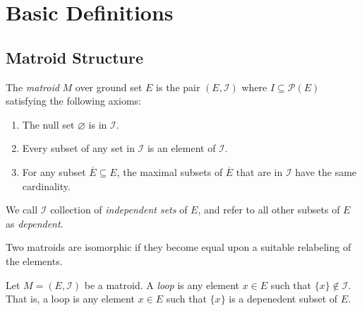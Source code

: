 \section{Basic Definitions}

\subsection{Matroid Structure}

\begin{definition}[matroid]
  \label{def:matroid}
  The \emph{matroid} $M$ over ground set $E$ is the pair $(E,\mathcal{I})$ where $I \subseteq \mathcal{P}(E)$ satisfying the following axioms:
  \begin{enumerate}[label=(\roman*)]
    \item The null set $\varnothing$ is in $\mathcal{I}$.
    \item Every subset of any set in $\mathcal{I}$ is an element of $\mathcal{I}$.
    \item For any subset $\overline{E} \subseteq E$, the maximal subsets of $\overline{E}$ that are in $\mathcal{I}$ have the same cardinality.
  \end{enumerate}
  We call $\mathcal{I}$ collection of \emph{independent sets} of $E$, and refer to all other subsets of $E$ as \emph{dependent}.
\end{definition}

\begin{definition}[isomorphism]
  \label{def:isomorphism}
  Two matroids are isomorphic if they become equal upon a suitable relabeling of the elements.
\end{definition}

\begin{definition}[loop]
  \label{def:loop}
  Let $M = (E, \mathcal{I})$ be a matroid. A \emph{loop} is any element $x \in E$ such that $\{x\} \notin \mathcal{I}$.
  That is, a loop is any element $x \in E$ such that $\{x\}$ is a depenedent subset of $E$.
\end{definition}

\begin{definition}[coloop]
  \label{def:coloop}
\end{definition}

\begin{definition}
  \label{def:parallel_elems}
\end{definition}

